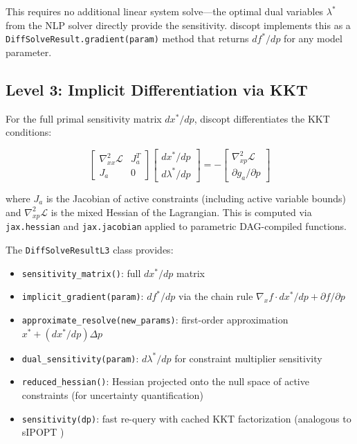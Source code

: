 \documentclass[12pt,preprint]{article}
\begin{document}
This requires no additional linear system solve---the optimal dual variables $\lambda^*$ from the NLP solver directly provide the sensitivity. discopt implements this as a \texttt{DiffSolveResult.gradient(param)} method that returns $df^*/dp$ for any model parameter.

\subsection{Level 3: Implicit Differentiation via KKT}
\label{org-level-3-implicit-differentiation-via-kkt}
For the full primal sensitivity matrix $dx^*/dp$, discopt differentiates the KKT conditions:


\begin{equation}
\begin{bmatrix}
\nabla^2_{xx}\mathcal{L} & J_a^T \\
J_a & 0
\end{bmatrix}
\begin{bmatrix}
dx^*/dp \\
d\lambda^*/dp
\end{bmatrix}
=
-\begin{bmatrix}
\nabla^2_{xp}\mathcal{L} \\
\partial g_a / \partial p
\end{bmatrix}
\end{equation}


where $J_a$ is the Jacobian of active constraints (including active variable bounds) and $\nabla^2_{xp}\mathcal{L}$ is the mixed Hessian of the Lagrangian. This is computed via \texttt{jax.hessian} and \texttt{jax.jacobian} applied to parametric DAG-compiled functions.


The \texttt{DiffSolveResultL3} class provides:


\begin{itemize}
\item \texttt{sensitivity\_matrix()}: full $dx^*/dp$ matrix

\item \texttt{implicit\_gradient(param)}: $df^*/dp$ via the chain rule $\nabla_x f \cdot dx^*/dp + \partial f/\partial p$

\item \texttt{approximate\_resolve(new\_params)}: first-order approximation $x^* + (dx^*/dp) \Delta p$

\item \texttt{dual\_sensitivity(param)}: $d\lambda^*/dp$ for constraint multiplier sensitivity

\item \texttt{reduced\_hessian()}: Hessian projected onto the null space of active constraints (for uncertainty quantification)

\item \texttt{sensitivity(dp)}: fast re-query with cached KKT factorization (analogous to sIPOPT \cite{Pirnay2012})

\end{itemize}
\end{document}
